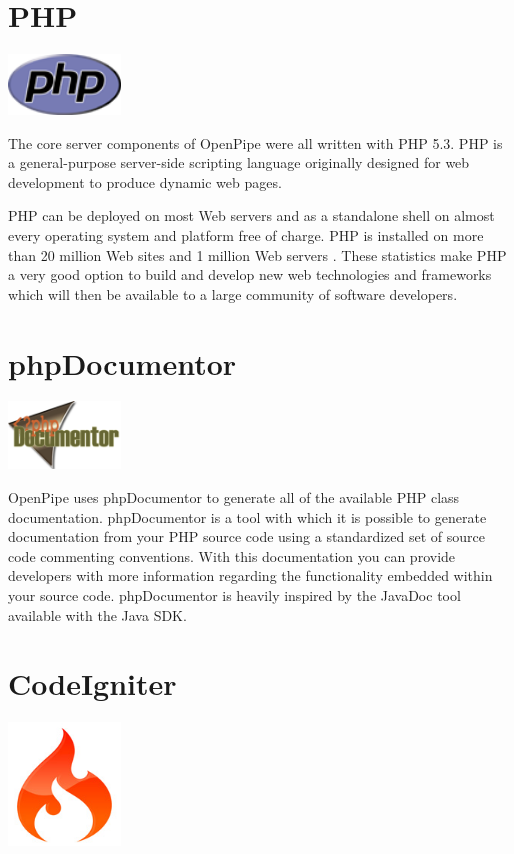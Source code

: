 \documentclass[12pt]{report}
\begin{document}
\section{PHP}
\begin{center} 
\includegraphics[width=30mm]{figures/images/php_logo.png}
\end{center}

The core server components of OpenPipe were all written with PHP 5.3. PHP is a general-purpose server-side scripting language originally designed for web development to produce dynamic web pages.

PHP can be deployed on most Web servers and as a standalone shell on almost every operating system and platform free of charge.  PHP is installed on more than 20 million Web sites and 1 million Web servers \cite{phpWiki}. These statistics make PHP a very good option to build and develop new web technologies and frameworks which will then be available to a large community of software developers.


\section{phpDocumentor}
\begin{center} 
\includegraphics[width=30mm]{figures/images/php_documentor_logo.png}
\end{center}

OpenPipe uses phpDocumentor to generate all of the available PHP class documentation. phpDocumentor is a tool with which it is possible to generate documentation from your PHP source code using a standardized set of source code commenting conventions. With this documentation you can provide developers with more information regarding the functionality embedded within your source code. phpDocumentor is heavily inspired by the JavaDoc tool available with the Java SDK. 


\section{CodeIgniter}
\begin{center}
\includegraphics[width=30mm]{figures/images/ci_logo.jpg}
\end{center}
\end{document}
